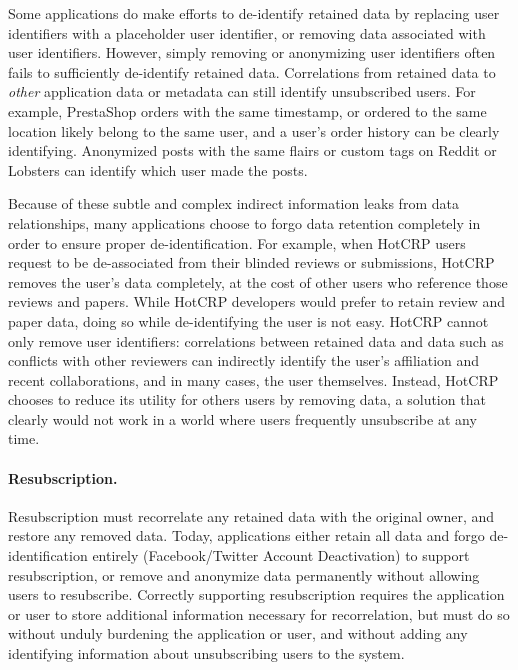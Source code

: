 Some applications do make efforts to de-identify retained data by replacing user identifiers with a
placeholder user identifier, or removing data associated with user identifiers.  However, simply
removing or anonymizing user identifiers often fails to sufficiently de-identify retained data.
Correlations from retained data to \emph{other} application data or metadata can still identify
unsubscribed users. For example, PrestaShop orders with the same timestamp, or ordered to the same
location likely belong to the same user, and a user's order history can be clearly identifying.
Anonymized posts with the same flairs or custom tags on Reddit or Lobsters can identify which user
made the posts.

Because of these subtle and complex indirect information leaks from data relationships, many
applications choose to forgo data retention completely in order to ensure proper de-identification.
For example, when HotCRP users request to be de-associated from their blinded reviews or
submissions, HotCRP removes the user's data completely, at the cost of other users who reference
those reviews and papers. While HotCRP developers would prefer to retain review and paper data,
doing so while de-identifying the user is not easy. HotCRP cannot only remove user identifiers:
correlations between retained data and data such as conflicts with other reviewers can indirectly
identify the user's affiliation and recent collaborations, and in many cases, the user themselves.
Instead, HotCRP chooses to reduce its utility for others users by removing data, a solution that
clearly would not work in a world where users frequently unsubscribe at any time.

\paragraph{Resubscription.}
Resubscription must recorrelate any retained data with the original owner, and restore any removed
data. Today, applications either retain all data and forgo de-identification entirely
(Facebook/Twitter Account Deactivation) to support resubscription, or remove and anonymize data
permanently without allowing users to resubscribe. Correctly supporting resubscription requires the
application or user to store additional information necessary for recorrelation, but must do so
without unduly burdening the application or user, and without adding any identifying information
about unsubscribing users to the system.

%

